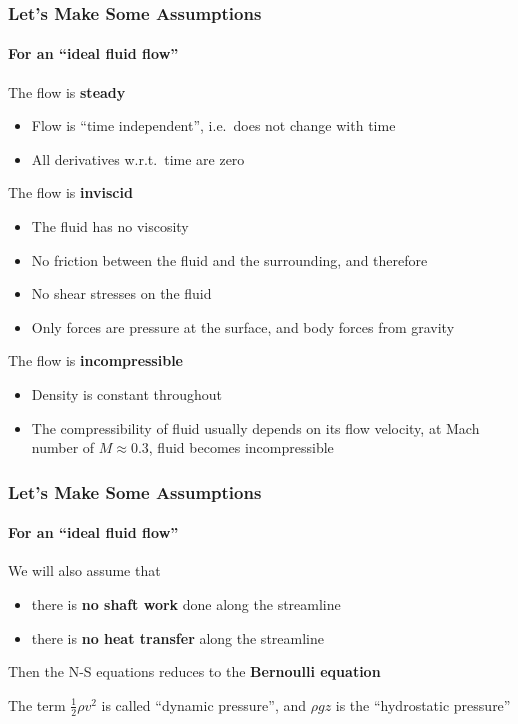 \documentclass[12pt,aspectratio=169]{beamer}
\newcommand{\eq}[2]{\vspace{#1}{\Large\begin{displaymath}#2\end{displaymath}}}
\begin{document}
\begin{frame}
  \frametitle{Let's Make Some Assumptions}
  \framesubtitle{For an ``ideal fluid flow''}
  The flow is \textbf{steady}
  \begin{itemize}
  \item Flow is ``time independent'', i.e.\ does not change with time
  \item All derivatives w.r.t.\ time are zero
  \end{itemize}

  The flow is \textbf{inviscid}
  \begin{itemize}
  \item The fluid has no viscosity
  \item No friction between the fluid and the surrounding, and therefore
  \item No shear stresses on the fluid
  \item Only forces are pressure at the surface, and body forces from gravity
  \end{itemize}

  The flow is \textbf{incompressible}
  \begin{itemize}
  \item Density is constant throughout
  \item The compressibility of fluid usually depends on its flow velocity,
    at Mach number of $M\approx 0.3$, fluid becomes incompressible
  \end{itemize}
\end{frame}



\begin{frame}
  \frametitle{Let's Make Some Assumptions}
  \framesubtitle{For an ``ideal fluid flow''}
  We will also assume that
  \begin{itemize}
  \item there is \textbf{no shaft work} done along the streamline
  \item there is \textbf{no heat transfer} along the streamline
  \end{itemize}
  Then the N-S equations reduces to the
  \textbf{Bernoulli equation}
  
  \eq{-.1in}{\boxed{
      p_1+\frac{1}{2}\rho v_1^2 + \rho gz_1=
      p_2+\frac{1}{2}\rho v_2^2 + \rho gz_2
    }
  }
  
  The term $\displaystyle\frac{1}{2}\rho v^2$ is called ``dynamic pressure'',
  and $\rho gz$ is the ``hydrostatic pressure''
\end{frame}
\end{document}

